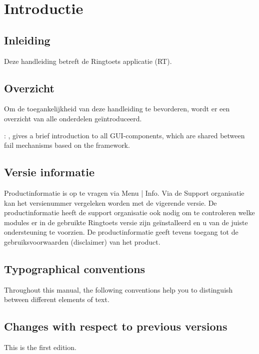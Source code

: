 
\chapter{Introductie\label{chap:guide}}

\section{Inleiding}
Deze handleiding betreft de Ringtoets applicatie (RT).

\section{Overzicht}
Om de toegankelijkheid van deze handleiding te bevorderen, wordt er een overzicht van alle onderdelen ge\"{i}ntroduceerd.

: , gives a brief introduction to all GUI-components, which are shared between fail mechanisms based on the framework.

\section{Versie informatie}
Productinformatie is op te vragen via Menu | Info. Via de Support organisatie kan het versienummer
vergeleken worden met de vigerende versie. De productinformatie heeft de support
organisatie ook nodig om te controleren welke modules er in de gebruikte Ringtoets versie
zijn geïnstalleerd en u van de juiste ondersteuning te voorzien. De productinformatie geeft
tevens toegang tot de gebruiksvoorwaarden (disclaimer) van het product.

\section{Typographical conventions}
Throughout this manual, the following conventions help you to distinguish between different
elements of text.


\section{Changes with respect to previous versions}
This is the first edition.